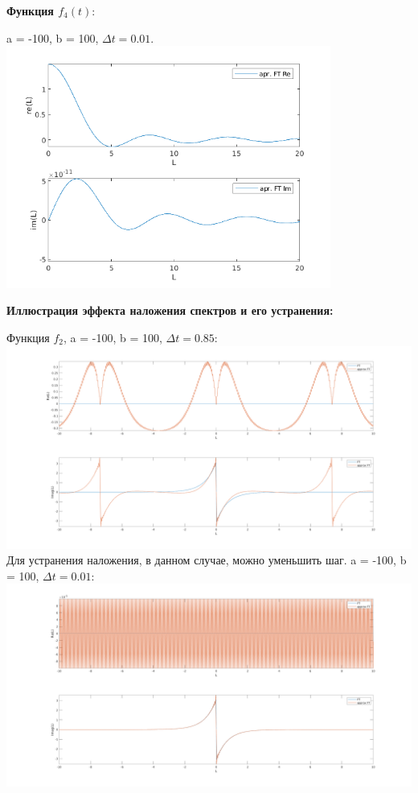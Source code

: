 \documentclass[11pt]{article}
\begin{document}
		{\hspace{-1cm}\bf \large Функция $f_4(t):$}
	\begin{center}
		{a = -100, b = 100, $\Delta t = 0.01.$}
		\newline
		\includegraphics[width=0.8\textwidth]{f4.png}\\
	\end{center}
	\newpage
	{\hspace{-1cm}\bf \large Иллюстрация эффекта наложения спектров и его устранения:}
	\begin{center}
		{Функция $f_2$, a = -100, b = 100, $\Delta t = 0.85$:}
		\newline
		\includegraphics[width=1\textwidth]{nalf_1.png}\\
	
		{Для устранения наложения, в данном случае, можно уменьшить шаг. a = -100, b = 100, $\Delta t = 0.01$:}
		\newline
		\includegraphics[width=1\textwidth]{nalf_2.png}\\
	\end{center}
\end{document}
